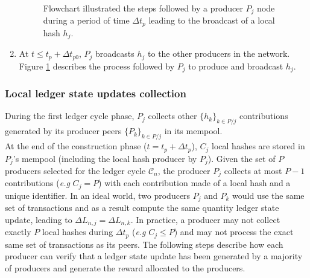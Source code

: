 \begin{enumerate}
\begin{figure}[H]
\label{fig:LLSU}
\caption{\label{fig:LLSU} Flowchart illustrated the steps followed by a producer $P_j$ node during a period of time $\Delta t_{p}$ leading to the broadcast of a local hash $h_j$.}
\end{figure}
\item At $t \leq t_p + \Delta t_{p0}$, $P_j$ broadcasts $h_j$ to the other producers in the network. Figure \ref{fig:LLSU} describes the process followed by $P_j$ to produce and broadcast $h_j$.  
\end{enumerate}

\subsubsection{Local ledger state updates collection}

During the first ledger cycle phase, $P_j$ collects other $\{h_k\}_{k \in P/j}$ contributions generated by its producer peers $\{P_k\}_{k \in P/j}$ in its mempool. \\

At the end of the construction phase ($t = t_p + \Delta t_{p}$), $C_j$ local hashes are stored in $P_j$'s mempool (including the local hash producer by $P_j$). Given the set of $P$ producers selected for the ledger cycle $\mathcal{C}_n$, the producer $P_j$ collects at most $P - 1$ contributions (\textit{e.g} $C_j = P$) with each contribution made of a local hash and a unique identifier. In an ideal world, two producers $P_j$ and $P_k$ would use the same set of transactions and as a result compute the same quantity ledger state update, leading to $\Delta L_{n,j} = \Delta L_{n,k}$. In practice, a producer may not collect exactly $P$ local hashes during $\Delta t_{p}$  (\textit{e.g} $C_j \leq P$) and may not process the exact same set of transactions as its peers. The following steps describe how each producer can verify that a ledger state update has been generated by a majority of producers and generate the reward allocated to the producers. 

